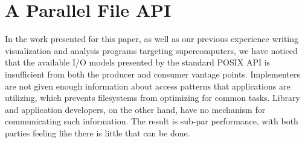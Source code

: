 



\section{A Parallel File API}\label{sec:design}

In the work presented for this paper, as well as our previous
experience writing visualization and analysis programs targeting
supercomputers, we have noticed that the available I/O models presented
by the standard POSIX API is insufficient from both the producer and
consumer vantage points.  Implementers are not given enough information
about access patterns that applications are utilizing, which prevents
filesystems from optimizing for common tasks.  Library and application
developers, on the other hand, have no mechanism for communicating such
information.  The result is sub-par performance, with both parties
feeling like there is little that can be done.

